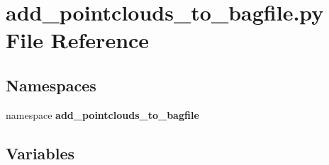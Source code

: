 \section{add\-\_\-pointclouds\-\_\-to\-\_\-bagfile.\-py \-File \-Reference}
\label{add__pointclouds__to__bagfile_8py}
\subsection*{\-Namespaces}
\begin{DoxyCompactItemize}
\item 
namespace {\bf add\-\_\-pointclouds\-\_\-to\-\_\-bagfile}
\end{DoxyCompactItemize}
\subsection*{\-Variables}
